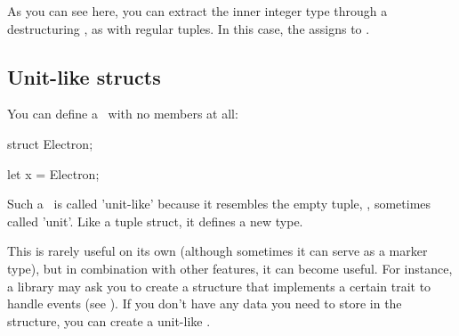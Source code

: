 As you can see here, you can extract the inner integer type through a destructuring \keylet, as with regular tuples. In this case, the 
 assigns  to .

\subsection*{Unit-like structs}

You can define a \struct\ with no members at all:

\begin{rustc}
struct Electron;

let x = Electron;
\end{rustc}

Such a \struct\ is called 'unit-like' because it resembles the empty tuple, \code{()}, sometimes called 'unit'. Like a tuple struct, 
it defines a new type.

\blank

This is rarely useful on its own (although sometimes it can serve as a marker type), but in combination with other features, it can 
become useful. For instance, a library may ask you to create a structure that implements a certain trait to handle events 
(see ). If you don't have any data you need to store in the structure, you can create a unit-like \struct.
